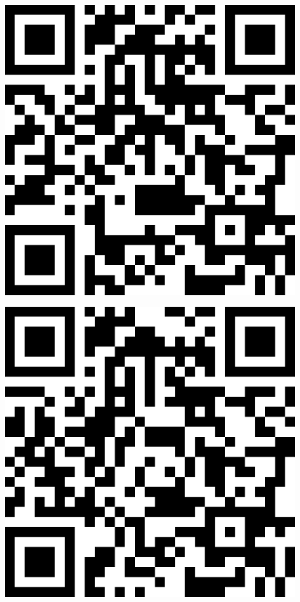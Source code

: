 \documentclass[letterpaper]{article}
\begin{document}
 \endgroup 
 \vspace*{\fill} 
 \pagebreak 
{} 
 \vspace*{\fill} 
 \begingroup 
 \centerline{\includegraphics[scale=1,width=5in,height=5in]{SWlounge.png}} 
 \endgroup 
 \vspace*{\fill} 
 \pagebreak 
{} 
 \vspace*{\fill} 
 \begingroup 
 \centerline{\includegraphics[scale=1,width=5in,height=5in]{StudentCenter.png}} 
 \endgroup 
 \vspace*{\fill} 
 \pagebreak 
\end{document}
